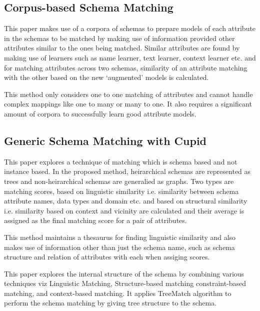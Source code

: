 \documentclass[conference]{IEEEtran}
\begin{document}
\subsection*{\textbf{Corpus-based Schema Matching}\cite{ref4}}
This paper makes use of a corpora of schemas to prepare models of each attribute in the schemas to be matched by making use of information provided other attributes similar to the ones being matched. Similar attributes are found by making use of learners such as name learner, text learner, context learner etc. and for matching attributes across two schemas, similarity of an attribute matching with the other based on the new `augmented' models is calculated. 

This method only considers one to one matching of attributes and cannot handle complex mappings like one to many or many to one. It also requires a significant amount of corpora to successfully learn good attribute models.

\subsection*{\textbf{Generic Schema Matching with Cupid}\cite{ref3}}
This paper explores a technique of matching which is schema based and not instance based. In the proposed method, heirarchical schemas are represented as trees and non-heirarchical schemas are generalied as graphs. Two types are matching scores, based on linguistic similarity i.e. similarity between schema attribute names, data types and domain etc. and based on structural similarity i.e. similarity based on context and vicinity are calculated and their average is assigned as the final matching score for a pair of attributes.

This method maintains a thesaurus for finding linguistic similarity and also makes use of information other than just the schema name, such as schema structure and relation of attributes with each when assiging scores.

\iffalse
This paper explores the internal structure of the schema by combining various techniques viz Linguistic Matching, Structure-based matching constraint-based matching, and context-based matching. It applies TreeMatch algorithm to perform the schema matching by giving tree structure to the schema.
\end{document}
